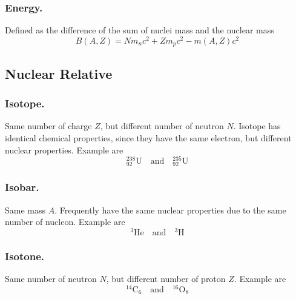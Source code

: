 \documentclass[../../../main.tex]{subfiles}
\begin{document}
\subsubsection*{Energy.} Defined as the difference of the sum of nuclei mass and the nuclear mass 
\begin{equation*}
    B(A,Z)=Nm_nc^2+Zm_pc^2-m(A,Z)c^2
\end{equation*} 

\subsection*{Nuclear Relative}
\subsubsection*{Isotope.} Same number of charge $Z$, but different number of neutron $N$. Isotope has identical chemical properties, since they have the same electron, but different nuclear properties. Example are
\begin{equation*}
    ^{238}_{92}\text{U}\quad\text{and}\quad    ^{235}_{92}\text{U}
\end{equation*}

\subsubsection*{Isobar.} Same mass $A$. Frequently have the same nuclear properties due to the same number of nucleon. Example are
\begin{equation*}
    ^{3}\text{He}\quad\text{and}\quad    ^{3}\text{H}
\end{equation*}

\subsubsection*{Isotone.} Same number of neutron $N$, but different number of proton $Z$. Example are
\begin{equation*}
    ^{14}\text{C}_6\quad\text{and}\quad    ^{16}\text{O}_8
\end{equation*}
\end{document}
